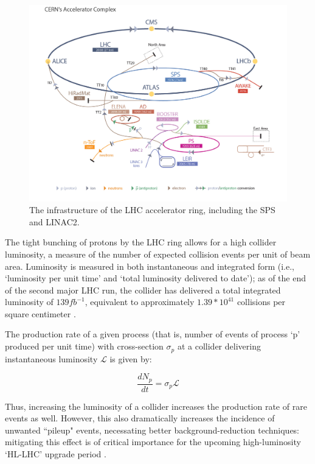 \begin{figure}
  \includegraphics[width=\linewidth]{figures/detector_chapter/LHCRing.png}
  \caption{The infrastructure of the LHC accelerator ring, including the SPS and LINAC2. \cite{LHCRing}}
  \label{fig:LHC}
\end{figure}

The tight bunching of protons by the LHC ring allows for a high collider luminosity, a measure of the number of expected collision events per unit of beam area. Luminosity is measured in both instantaneous and integrated form (i.e., `luminosity per unit time' and `total luminosity delivered to date'); as of the end of the second major LHC run, the collider has delivered a total integrated luminosity of $139 fb^{-1}$, equivalent to approximately $1.39*10^{41}$ collisions per square centimeter \cite{ATLAS-CONF-2019-021}. 

The production rate of a given process (that is, number of events of process `p' produced per unit time) with cross-section $\sigma_{p}$ at a collider delivering instantaneous luminosity $\mathcal{L}$ is given by:

\begin{equation}
\frac{dN_{p}}{dt} = \sigma_{p} \mathcal{L}
\end{equation}

Thus, increasing the luminosity of a collider increases the production rate of rare events as well. However, this also dramatically increases the incidence of unwanted ``pileup" events, necessating better background-reduction techniques: mitigating this effect is of critical importance for the upcoming high-luminosity `HL-LHC' upgrade period \cite{HLLHC}.

